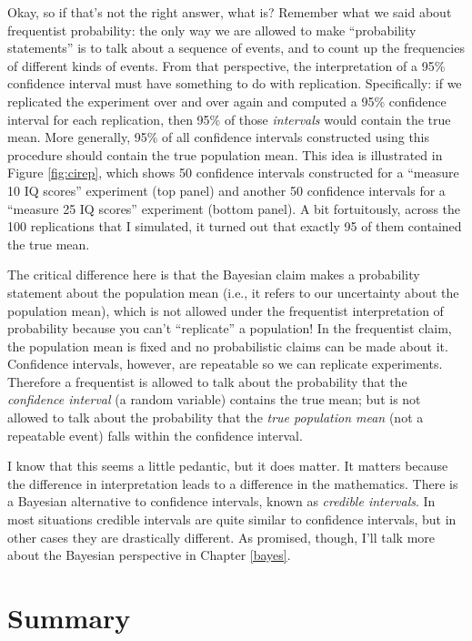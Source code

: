 \documentclass[spanish,]{book}
\begin{document}
Okay, so if that's not the right answer, what is? Remember what we said
about frequentist probability: the only way we are allowed to make
``probability statements'' is to talk about a sequence of events, and to
count up the frequencies of different kinds of events. From that
perspective, the interpretation of a 95\% confidence interval must have
something to do with replication. Specifically: if we replicated the
experiment over and over again and computed a 95\% confidence interval
for each replication, then 95\% of those \emph{intervals} would contain
the true mean. More generally, 95\% of all confidence intervals
constructed using this procedure should contain the true population
mean. This idea is illustrated in Figure \ref{fig:cirep}, which shows 50
confidence intervals constructed for a ``measure 10 IQ scores''
experiment (top panel) and another 50 confidence intervals for a
``measure 25 IQ scores'' experiment (bottom panel). A bit fortuitously,
across the 100 replications that I simulated, it turned out that exactly
95 of them contained the true mean.

The critical difference here is that the Bayesian claim makes a
probability statement about the population mean (i.e., it refers to our
uncertainty about the population mean), which is not allowed under the
frequentist interpretation of probability because you can't
``replicate'' a population! In the frequentist claim, the population
mean is fixed and no probabilistic claims can be made about it.
Confidence intervals, however, are repeatable so we can replicate
experiments. Therefore a frequentist is allowed to talk about the
probability that the \emph{confidence interval} (a random variable)
contains the true mean; but is not allowed to talk about the probability
that the \emph{true population mean} (not a repeatable event) falls
within the confidence interval.

I know that this seems a little pedantic, but it does matter. It matters
because the difference in interpretation leads to a difference in the
mathematics. There is a Bayesian alternative to confidence intervals,
known as \emph{credible intervals}. In most situations credible
intervals are quite similar to confidence intervals, but in other cases
they are drastically different. As promised, though, I'll talk more
about the Bayesian perspective in Chapter \ref{bayes}.

\section{Summary}\label{summary}
\end{document}
